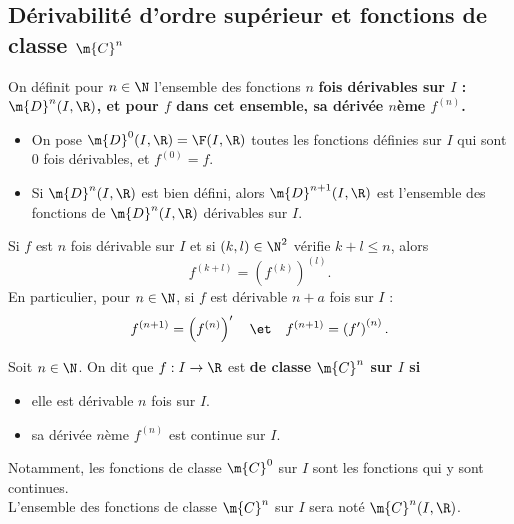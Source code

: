 \documentclass[11pt]{article}
\begin{document}
\subsection{Dérivabilité d'ordre supérieur et fonctions de classe \texorpdfstring{$\m{C}^n$}{Lg}}

\begin{defi}{}{}
    On définit pour $n\in\N$ l'ensemble des fonctions $n$ \bf{fois dérivables} sur $I$ : $\m{D}^n(I,\R)$, et pour $f$ dans cet ensemble, sa \bf{dérivée $n$ème} $f^{(n)}$.
    \begin{itemize}
        \item On pose $\m{D}^0(I,\R)=\F(I,\R)$ toutes les fonctions définies sur $I$ qui sont 0 fois dérivables, et $f^{(0)}=f$.
        \item Si $\m{D}^n(I,\R)$ est bien défini, alors $\m{D}^{n+1}(I,\R)$ est l'ensemble des fonctions de $\m{D}^n(I,\R)$ dérivables sur $I$.  
    \end{itemize}
\end{defi}

\begin{lemme}{}{}
    Si $f$ est $n$ fois dérivable sur $I$ et si $(k,l)\in\N^2$ vérifie $k+l\leq n$, alors
    \begin{equation*}
        f^{(k+l)}=\left( f^{(k)} \right)^(l).
    \end{equation*}
    En particulier, pour $n\in\N$, si $f$ est dérivable $n+a$ fois sur $I$ :
    \begin{equation*}
        f^{(n+1)}=\left( f^{(n)} \right)' \quad\et\quad f^{(n+1)}=\left( f' \right)^{(n)}.
    \end{equation*}
\end{lemme}

\begin{defi}{}{}
    Soit $n\in\N$. On dit que $f:I\to\R$ est \bf{de classe} $\m{C}^n$ sur $I$ si
    \begin{itemize}
        \item elle est dérivable $n$ fois sur $I$.
        \item sa dérivée $n$ème $f^{(n)}$ est continue sur $I$.
    \end{itemize}
    Notamment, les fonctions de classe $\m{C}^0$ sur $I$ sont les fonctions qui y sont continues.\\
    L'ensemble des fonctions de classe $\m{C}^n$ sur $I$ sera noté $\m{C}^n(I,\R)$.
\end{defi}
\end{document}
